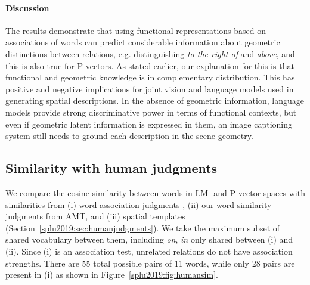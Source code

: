 \paragraph{Discussion} The results demonstrate that using functional
representations based on associations of words
can predict considerable information about geometric distinctions between
relations, e.g. distinguishing \emph{to the right of} and \emph{above}, and
this is also true for P-vectors. As stated earlier, our explanation for this is
that functional and geometric knowledge is in complementary distribution.
This has positive and negative implications for joint vision and language
models used in generating spatial descriptions.
In the absence of geometric information, language models provide strong
discriminative power in terms of functional contexts, but even if geometric
latent information is expressed in them, an image captioning system still needs
to ground each description in the scene geometry.



\subsection{Similarity with human judgments}\label{splu2019:sec:extrinsic}
We compare the cosine similarity between words in LM- and P-vector spaces with
similarities from (i) word association judgments \cite{de2018small},
(ii) our word similarity judgments from AMT, and
(iii) spatial templates (Section~\ref{splu2019:sec:humanjudgments}). We take the maximum
subset of shared vocabulary between them, including \emph{on}, \emph{in} only
shared between (i) and (ii).
Since (i) is an association test, unrelated relations do not have association
strengths. There are 55 total possible pairs of 11 words, while only 28 pairs
are present in (i) as shown in Figure~\ref{splu2019:fig:humansim}.


